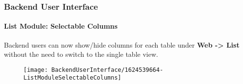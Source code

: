 %

\begin{frame}[fragile]
	\frametitle{Backend User Interface}
	\framesubtitle{List Module: Selectable Columns}

	Backend users can now show/hide columns for each table under
	\textbf{Web -> List} without the need to switch to the single table view.

	\begin{figure}
		\texttt{[image: BackendUserInterface/1624539664-ListModuleSelectableColumns]}
	\end{figure}

\end{frame}

